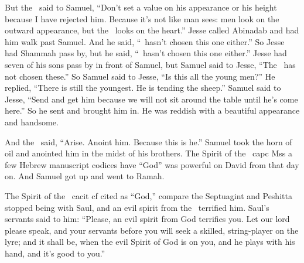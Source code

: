\begin{inparaenum}
   But the \lord\ said to Samuel, ``Don't set a value on his appearance or his height because I have rejected him. Because it's not like man sees: men look on the outward appearance, but the \lord\ looks on the heart.''%
   Jesse called Abinadab and had him walk past Samuel. And he said, ``\lord\ hasn't chosen this one either.''%
   So Jesse had Shammah pass by, but he said, ``\lord\ hasn't chosen this one either.''%
   Jesse had seven of his sons pass by in front of Samuel, but Samuel said to Jesse, ``The \lord\ has not chosen these.''%
   So Samuel said to Jesse, ``Is this all the young men?'' He replied, ``There is still the youngest. He is tending the sheep.'' Samuel said to Jesse, ``Send and get him because we will not sit around the table until he's come here.''%
   So he sent and brought him in. He was reddish with a beautiful appearance and handsome.%

  And the \lord\ said, ``Arise. Anoint him. Because this is he.''%
   Samuel took the horn of oil and anointed him in the midst of his brothers. The Spirit of the \lord\ ca{pc Mss }{a few Hebrew manuscript codices have ``God''} was powerful on David from that day on. And Samuel got up and went to Ramah.%

   The Spirit of the \lord\ ca{cit  cf \septuagint{}\peshitta}{cited as ``God,'' compare the Septuagint and Peshitta} stopped being with Saul, and an evil spirit from the \lord\ terrified him.%
   Saul's servants said to him: ``Please, an evil spirit from God terrifies you.%
   Let our lord please speak, and your servants before you will seek a skilled, string-player on the lyre; and it shall be, when the evil Spirit of God is on you, and he plays with his hand, and it's good to you.''%


\end{inparaenum}
